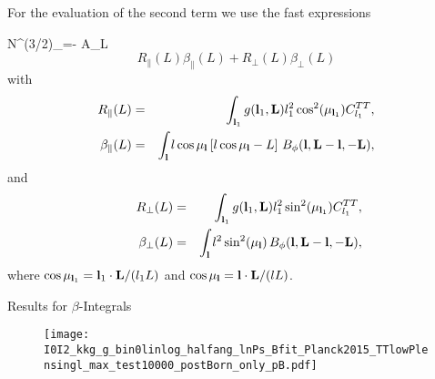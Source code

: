 \documentclass[prd,superscriptaddress,nofootinbib,floatfix,notitlepage]{revtex4-1}
\begin{document}
For the evaluation of the second term we use the fast expressions

\beq
N^{(3/2)}_{}=- A_L \[R_{\parallel}(L) \beta_{\parallel}(L)+R_{\perp}(L) \beta_{\perp}(L)\]
\eeq
with
\begin{eqnarray}
  \label{eq:Rparallel}
R_\parallel(L) &=& \int_{{\bf l}_1}g({\bf l}_1,{\bf L})  l_1^2\cos^2(\mu_{{\bf l}_1}) C_{l_1}^{TT}, \\
\label{eq:betaparallel}
  \beta_\parallel(L) &=& \int_{{\bf l}}  l\cos\mu_{\bf l}\left[ l\cos\mu_{\bf l} - L \right] \,B_\phi({\bf l},{\bf L}-{\bf l},-{\bf L}),
\end{eqnarray}
and
\begin{eqnarray}
\label{eq:Rperp}
\qquad
R_\perp(L) &=& \int_{{\bf l}_1}g({\bf l}_1,{\bf L})  l_1^2 \sin^2(\mu_{{\bf l}_1}) C^{TT}_{l_1},\\
  \label{eq:betaperp}
  \beta_\perp(L) &=& \int_{\bf l}  l^2 \sin^2(\mu_{\bf l}) \,B_\phi({\bf l},{\bf L}-{\bf l},-{\bf L}),
\end{eqnarray}
where $\cos\mu_{{\bf l}_1}={\bf l}_1\cdot{\bf L}/(l_1L)$ and $\cos\mu_{\bf l}={\bf l}\cdot{\bf L}/(lL)$.


Results for $\beta$-Integrals
\begin{figure}[tp]
\begin{center}
\texttt{[image: I0I2\_kkg\_g\_bin0linlog\_halfang\_lnPs\_Bfit\_Planck2015\_TTlowPlensingl\_max\_test10000\_postBorn\_only\_pB.pdf]}
\caption{\label{fig:1}  }
\end{center}
\end{figure}



\end{document}
